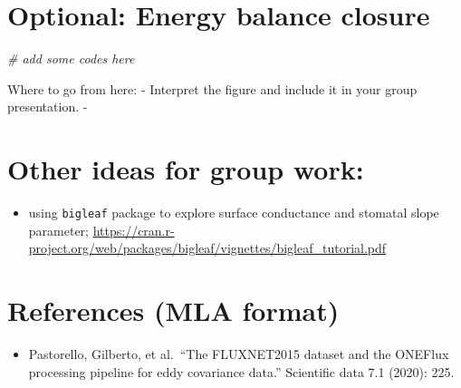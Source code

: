 \documentclass[
]{article}
\newenvironment{Shaded}{\begin{snugshade}}{\end{snugshade}}
\newcommand{\CommentTok}[1]{\textcolor[rgb]{0.56,0.35,0.01}{\textit{#1}}}
\providecommand{\tightlist}{%
  \setlength{\itemsep}{0pt}\setlength{\parskip}{0pt}}
\begin{document}
\section{Optional: Energy balance
closure}\label{optional-energy-balance-closure}

\begin{Shaded}
\begin{Highlighting}[]
\CommentTok{\# add some codes here}
\end{Highlighting}
\end{Shaded}

Where to go from here: - Interpret the figure and include it in your
group presentation. -

\section{Other ideas for group work:}\label{other-ideas-for-group-work}

\begin{itemize}
\tightlist
\item
  using \texttt{bigleaf} package to explore surface conductance and
  stomatal slope parameter;
  \url{https://cran.r-project.org/web/packages/bigleaf/vignettes/bigleaf_tutorial.pdf}
\end{itemize}

\section{References (MLA format)}\label{references-mla-format}

\begin{itemize}
\tightlist
\item
  Pastorello, Gilberto, et al.~``The FLUXNET2015 dataset and the ONEFlux
  processing pipeline for eddy covariance data.'' Scientific data 7.1
  (2020): 225.
\end{itemize}
\end{document}
